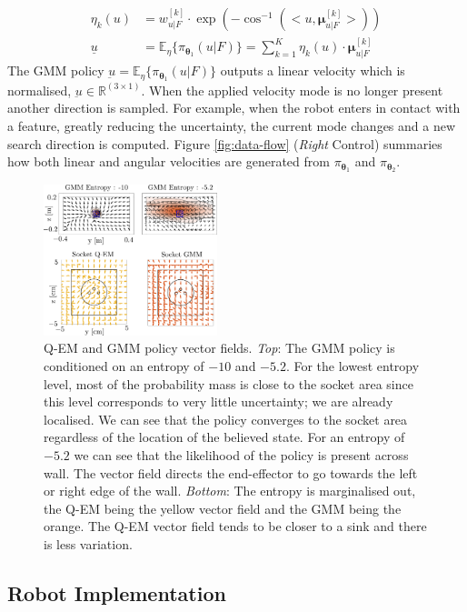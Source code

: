 \documentclass[final,5p,times,twocolumn]{elsarticle}
\newcommand{\MuK}{\boldsymbol{\mu}^{[k]}}
\newcommand{\xb}{u|F}
\newcommand{\Param}{\boldsymbol{\theta}}
\begin{document}
\begin{align}
 \eta_k(u) &= w^{[k]}_{\xb} \cdot \exp(-\cos^{-1}(<u,\MuK_{\xb}>)) \label{eq:alpha_eq}\\
 \underline{u} &= \mathbb{E}_{\eta}\{\pi_{\Param_1}(\xb)\} = \sum_{k=1}^K \eta_k(u) \cdot \MuK_{\xb} \label{eq:alpha_expectation}
\end{align}
The GMM policy $\underbar{u} = \mathbb{E}_{\eta}\{\pi_{\Param_1}(u \lvert F)\}$ outputs a linear velocity which 
is normalised, $\underbar{u} \in \mathbb{R}^{(3 \times 1)}$. When the applied velocity mode is no longer present another direction is sampled. 
For example, when the robot enters in contact with a feature, greatly reducing the uncertainty, the current mode changes and a 
new search direction is computed. Figure \ref{fig:data-flow} (\textit{Right} Control) summaries how both linear and angular 
velocities are generated from $\pi_{\Param_1}$ and $\pi_{\Param_2}$.

\begin{figure}
   \includegraphics[width=0.45\textwidth]{./Figures/Fig/policy_vf.pdf}
  \caption{Q-EM and GMM policy vector fields. \textit{Top}: The GMM policy is conditioned on an entropy of $-10$ and $-5.2$. For the lowest entropy level,
  most of the probability mass is close to the socket area since this level corresponds to very little uncertainty; we are already localised. We can see 
  that the policy converges to the socket area regardless of the location of the believed state. For an entropy of $-5.2$ we can see that 
  the likelihood of the policy is present across wall. The vector field directs the end-effector to go towards the left or right edge of the wall. 
  \textit{Bottom}: The entropy is marginalised out, the Q-EM being the yellow vector field and the GMM being the orange.
  The Q-EM vector field tends to be closer to a sink and there is less variation.}
  \label{fig:policy_vf}
\end{figure}

\subsection{Robot Implementation}
\end{document}

